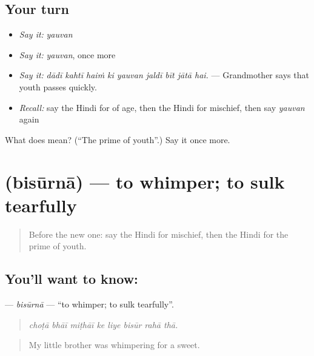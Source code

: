 \subsection*{Your turn}
\begin{itemize}
\raggedright
  \item \emph{Say it:} \emph{yauvan}
  \item \emph{Say it:} \emph{yauvan}, once more
  \item \emph{Say it:} \emph{dādī kahtī haiṁ ki yauvan jaldī bīt jātā hai.} — Grandmother says that youth passes quickly.
  \item \emph{Recall:} say the Hindi for of age, then the Hindi for mischief, then say \emph{yauvan} again
\end{itemize}

\begin{tcolorbox}[breakable,colback=teal!4,colframe=teal!35!black,title={Before you move on}]
What does  mean? (\textquotedblleft{}The prime of youth\textquotedblright{}.) Say it once more.
\end{tcolorbox}
\section[\texorpdfstring{\hi{बिसूरना} (bisūrnā)}{बिसूरना (bisūrnā)}]{ (bisūrnā) — to whimper; to sulk tearfully}

\label{lesson:HI-C499-bisurna}



\begin{quote}
Before the new one: say the Hindi for mischief, then the Hindi for the prime of youth.
\end{quote}

\subsection*{You'll want to know: }
\textbf{} — \emph{bisūrnā} — \textquotedblleft{}to whimper; to sulk tearfully\textquotedblright{}.

\begin{quote}
       
\end{quote}

\begin{quote}
\emph{choṭā bhāī miṭhāī ke liye bisūr rahā thā.}
\end{quote}

\begin{quote}
My little brother was whimpering for a sweet.
\end{quote}

